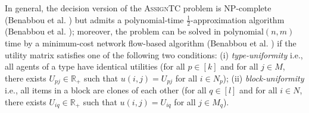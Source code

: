 \documentclass[11pt,dvipdfmx]{article}
\newcommand{\R}{\mathbb{R}}
\newcommand{\ASTC}{\textsc{AssignTC}\xspace}
\begin{document}
In general, the decision version of the \ASTC problem is NP-complete (Benabbou et al. \cite[Theorem 3.2]{benabbou2017diversity}) but admits a polynomial-time $\tfrac{1}{2}$-approximation algorithm (Benabbou et al. \cite[Theorem 3.4]{benabbou2017diversity}); moreover, the problem can be solved in $\mathrm{polynomial}(n,m)$ time by a minimum-cost network flow-based algorithm (Benabbou et al. \cite[Theorem 3.6]{benabbou2017diversity}) if the utility matrix satisfies one of the following two conditions: (i) \emph{type-uniformity} i.e., all agents of a type have identical utilities (for all $p \in [k]$ and for all $j\in M$, there exists $U_{pj} \in \R_+$ such that $u(i,j) = U_{pj}$ for all $i \in N_p$); (ii) \emph{block-uniformity} i.e., all items in a block are clones of each other (for all $q \in [l]$ and for all $i \in N$, there exists $U_{iq} \in \R_+$ such that $u(i,j) = U_{iq}$ for all $j \in M_q$).
\end{document}

